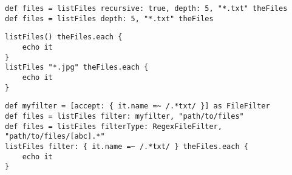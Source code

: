 \begin{lstlisting}[style=Groovybash, label={lst:example_listFiles_arguments}, title={%
List files in the current working directory with some additional arguments.}]
def files = listFiles recursive: true, depth: 5, "*.txt" theFiles
def files = listFiles depth: 5, "*.txt" theFiles
\end{lstlisting}

\begin{lstlisting}[style=Groovybash, label={lst:example_listFiles_iterate}, title={%
Iterate over the found files.}]
listFiles() theFiles.each {
    echo it
}
listFiles "*.jpg" theFiles.each {
    echo it
}
\end{lstlisting}

\begin{lstlisting}[style=Groovybash, label={lst:example_listFiles_filter}, title={%
List files using a custom file filter.}]
def myfilter = [accept: { it.name =~ /.*txt/ }] as FileFilter
def files = listFiles filter: myfilter, "path/to/files"
def files = listFiles filterType: RegexFileFilter, "path/to/files/[abc].*"
listFiles filter: { it.name =~ /.*txt/ } theFiles.each {
    echo it
}
\end{lstlisting}

